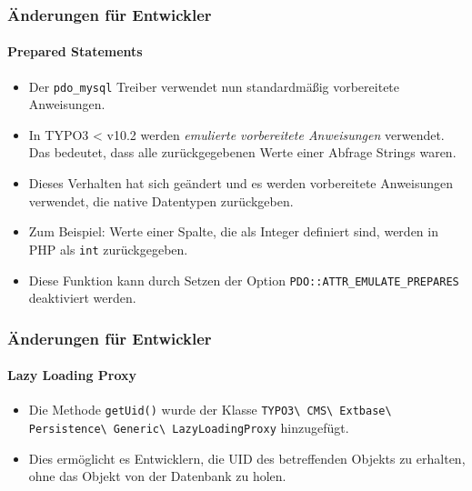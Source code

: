 \begin{frame}[fragile]
	\frametitle{Änderungen für Entwickler}
	\framesubtitle{Prepared Statements}

	\lstset{basicstyle=\tiny\ttfamily}

	\begin{itemize}
		\item Der \texttt{pdo\_mysql} Treiber verwendet nun standardmäßig vorbereitete Anweisungen.
		\item In TYPO3 < v10.2 werden \textit{emulierte vorbereitete Anweisungen} verwendet.
			Das bedeutet, dass alle zurückgegebenen Werte einer Abfrage Strings waren.
		\item Dieses Verhalten hat sich geändert und es werden vorbereitete Anweisungen verwendet, die native Datentypen zurückgeben.
		\item Zum Beispiel: Werte einer Spalte, die als Integer definiert sind, werden in PHP als \texttt{int} zurückgegeben.
		\item Diese Funktion kann durch Setzen der Option
			\texttt{PDO::ATTR\_EMULATE\_PREPARES} deaktiviert werden.

	\end{itemize}

\end{frame}


\begin{frame}[fragile]
	\frametitle{Änderungen für Entwickler}
	\framesubtitle{Lazy Loading Proxy}

	\lstset{basicstyle=\tiny\ttfamily}

	\begin{itemize}
		\item Die Methode \texttt{getUid()} wurde der Klasse\newline
			\texttt{TYPO3\textbackslash
				CMS\textbackslash
				Extbase\textbackslash
				Persistence\textbackslash
				Generic\textbackslash
				LazyLoadingProxy} hinzugefügt.
		\item Dies ermöglicht es Entwicklern, die UID des betreffenden Objekts zu erhalten, ohne das Objekt von der Datenbank zu holen.

	\end{itemize}

\end{frame}

